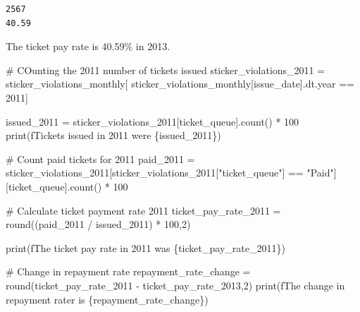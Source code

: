 \documentclass[
  letterpaper,
  DIV=11,
  numbers=noendperiod]{scrartcl}
\newenvironment{Shaded}{\begin{snugshade}}{\end{snugshade}}
\newcommand{\BuiltInTok}[1]{\textcolor[rgb]{0.00,0.23,0.31}{#1}}
\newcommand{\CommentTok}[1]{\textcolor[rgb]{0.37,0.37,0.37}{#1}}
\newcommand{\DecValTok}[1]{\textcolor[rgb]{0.68,0.00,0.00}{#1}}
\newcommand{\NormalTok}[1]{\textcolor[rgb]{0.00,0.23,0.31}{#1}}
\newcommand{\OperatorTok}[1]{\textcolor[rgb]{0.37,0.37,0.37}{#1}}
\newcommand{\SpecialCharTok}[1]{\textcolor[rgb]{0.37,0.37,0.37}{#1}}
\newcommand{\SpecialStringTok}[1]{\textcolor[rgb]{0.13,0.47,0.30}{#1}}
\newcommand{\StringTok}[1]{\textcolor[rgb]{0.13,0.47,0.30}{#1}}
\begin{document}
\begin{verbatim}
2567
40.59
\end{verbatim}

The ticket pay rate is 40.59\% in 2013.

\begin{Shaded}
\begin{Highlighting}[]
\CommentTok{\# COunting the 2011 number of tickets issued}
\NormalTok{sticker\_violations\_2011 }\OperatorTok{=}\NormalTok{ sticker\_violations\_monthly[}
\NormalTok{    sticker\_violations\_monthly[}\StringTok{\textquotesingle{}issue\_date\textquotesingle{}}\NormalTok{].dt.year }\OperatorTok{==} \DecValTok{2011}\NormalTok{]}

\NormalTok{issued\_2011 }\OperatorTok{=}\NormalTok{ sticker\_violations\_2011[}\StringTok{\textquotesingle{}ticket\_queue\textquotesingle{}}\NormalTok{].count() }\OperatorTok{*} \DecValTok{100}
\BuiltInTok{print}\NormalTok{(}\SpecialStringTok{f\textquotesingle{}Tickets issued in 2011 were }\SpecialCharTok{\{}\NormalTok{issued\_2011}\SpecialCharTok{\}}\SpecialStringTok{\textquotesingle{}}\NormalTok{)}

\CommentTok{\# Count paid tickets for 2011}
\NormalTok{paid\_2011 }\OperatorTok{=}\NormalTok{ sticker\_violations\_2011[sticker\_violations\_2011[}\StringTok{"ticket\_queue"}\NormalTok{]}
                                    \OperatorTok{==} \StringTok{"Paid"}\NormalTok{][}\StringTok{\textquotesingle{}ticket\_queue\textquotesingle{}}\NormalTok{].count() }\OperatorTok{*} \DecValTok{100}

\CommentTok{\# Calculate ticket payment rate 2011}
\NormalTok{ticket\_pay\_rate\_2011 }\OperatorTok{=} \BuiltInTok{round}\NormalTok{((paid\_2011 }\OperatorTok{/}\NormalTok{ issued\_2011) }\OperatorTok{*} \DecValTok{100}\NormalTok{,}\DecValTok{2}\NormalTok{)}

\BuiltInTok{print}\NormalTok{(}\SpecialStringTok{f\textquotesingle{}The ticket pay rate in 2011 was }\SpecialCharTok{\{}\NormalTok{ticket\_pay\_rate\_2011}\SpecialCharTok{\}}\SpecialStringTok{\textquotesingle{}}\NormalTok{)}

\CommentTok{\# Change in repayment rate}
\NormalTok{repayment\_rate\_change }\OperatorTok{=} \BuiltInTok{round}\NormalTok{(ticket\_pay\_rate\_2011 }\OperatorTok{{-}}\NormalTok{ ticket\_pay\_rate\_2013,}\DecValTok{2}\NormalTok{)}
\BuiltInTok{print}\NormalTok{(}\SpecialStringTok{f\textquotesingle{}The change in repayment rater is }\SpecialCharTok{\{}\NormalTok{repayment\_rate\_change}\SpecialCharTok{\}}\SpecialStringTok{\textquotesingle{}}\NormalTok{)}


\end{Highlighting}
\end{Shaded}
\end{document}

